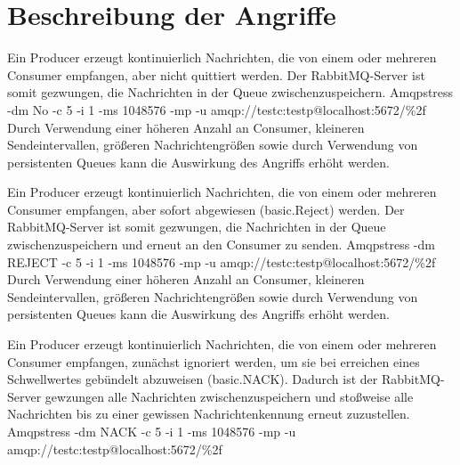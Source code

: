 \documentclass[	a4paper,
			11pt,
			titlepage,
			oneside,
			fleqn,
			listof=totoc,
			parskip,
			chapterprefix=false,
			numbers=noenddot]{scrreprt}
\begin{document}
	\usecase{}%
		{}%
		{}%
		{}
		
	\usecase{}%
		{}%
		{}%
		{}
	
	\clearpage
	\section*{Beschreibung der Angriffe}
		{Ein Producer erzeugt kontinuierlich Nachrichten, die von einem oder mehreren Consumer empfangen, aber nicht quittiert werden.%
		 Der RabbitMQ-Server ist somit gezwungen, die Nachrichten in der Queue zwischenzuspeichern.}%
		{}%
		{Amqpstress -dm No -c 5 -i 1 -ms 1048576 -mp -u amqp://testc:testp@localhost:5672/\%2f}%
		{}%
		{Durch Verwendung einer höheren Anzahl an Consumer, kleineren Sendeintervallen, größeren Nachrichtengrößen sowie durch Verwendung von persistenten %
		Queues kann die Auswirkung des Angriffs erhöht werden.}
	
	
		{Ein Producer erzeugt kontinuierlich Nachrichten, die von einem oder mehreren Consumer empfangen, aber sofort abgewiesen (basic.Reject) werden.%
		 Der RabbitMQ-Server ist somit gezwungen, die Nachrichten in der Queue zwischenzuspeichern und erneut an den Consumer zu senden.}%
		{}%
		{Amqpstress -dm REJECT -c 5 -i 1 -ms 1048576 -mp -u amqp://testc:testp@localhost:5672/\%2f}%
		{}%
		{Durch Verwendung einer höheren Anzahl an Consumer, kleineren Sendeintervallen, größeren Nachrichtengrößen sowie durch Verwendung von persistenten %
		Queues kann die Auswirkung des Angriffs erhöht werden.}
	
	
		{Ein Producer erzeugt kontinuierlich Nachrichten, die von einem oder mehreren Consumer empfangen, zunächst ignoriert werden, um sie bei erreichen eines Schwellwertes gebündelt abzuweisen (basic.NACK). Dadurch ist der RabbitMQ-Server gewzungen alle Nachrichten zwischenzuspeichern und stoßweise alle Nachrichten bis zu einer gewissen Nachrichtenkennung erneut zuzustellen.}%
		{}%
		{Amqpstress -dm NACK -c 5 -i 1 -ms 1048576 -mp -u amqp://testc:testp@localhost:5672/\%2f}%
		{}
		
		
\end{document}
